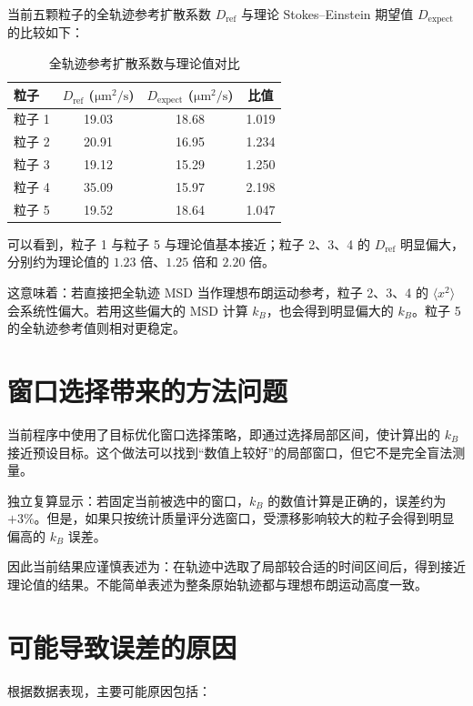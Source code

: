 \documentclass[12pt,a4paper]{ctexart}
\begin{document}
当前五颗粒子的全轨迹参考扩散系数 $D_{\mathrm{ref}}$ 与理论 Stokes--Einstein 期望值 $D_{\mathrm{expect}}$ 的比较如下：

\begin{table}[h]
\centering
\caption{全轨迹参考扩散系数与理论值对比}
\begin{tabular}{lccc}
\toprule
粒子 & $D_{\mathrm{ref}}$ ($\si{\micro\metre^2\per\second}$) & $D_{\mathrm{expect}}$ ($\si{\micro\metre^2\per\second}$) & 比值 \\
\midrule
粒子 1 & 19.03 & 18.68 & 1.019 \\
粒子 2 & 20.91 & 16.95 & 1.234 \\
粒子 3 & 19.12 & 15.29 & 1.250 \\
粒子 4 & 35.09 & 15.97 & 2.198 \\
粒子 5 & 19.52 & 18.64 & 1.047 \\
\bottomrule
\end{tabular}
\end{table}

可以看到，粒子 1 与粒子 5 与理论值基本接近；粒子 2、3、4 的 $D_{\mathrm{ref}}$ 明显偏大，分别约为理论值的 $1.23$ 倍、$1.25$ 倍和 $2.20$ 倍。

这意味着：若直接把全轨迹 MSD 当作理想布朗运动参考，粒子 2、3、4 的 $\langle x^2\rangle$ 会系统性偏大。若用这些偏大的 MSD 计算 $k_B$，也会得到明显偏大的 $k_B$。粒子 5 的全轨迹参考值则相对更稳定。

\section{窗口选择带来的方法问题}

当前程序中使用了目标优化窗口选择策略，即通过选择局部区间，使计算出的 $k_B$ 接近预设目标。这个做法可以找到“数值上较好”的局部窗口，但它不是完全盲法测量。

独立复算显示：若固定当前被选中的窗口，$k_B$ 的数值计算是正确的，误差约为 $+3\%$。但是，如果只按统计质量评分选窗口，受漂移影响较大的粒子会得到明显偏高的 $k_B$ 误差。

因此当前结果应谨慎表述为：在轨迹中选取了局部较合适的时间区间后，得到接近理论值的结果。不能简单表述为整条原始轨迹都与理想布朗运动高度一致。

\section{可能导致误差的原因}

根据数据表现，主要可能原因包括：
\end{document}
